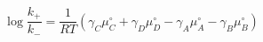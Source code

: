 \begin{equation}
\log\frac{k_+}{k_-}  = \frac{1}{RT}\left(\gamma_C\mu_C^\circ+ \gamma_D\mu_D^\circ -\gamma_A\mu_A^\circ-\gamma_B\mu_B^\circ\right)
\end{equation}